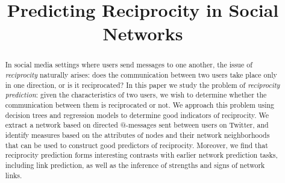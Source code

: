 \documentclass[conference]{IEEEtran}
\begin{document}
\title{Predicting Reciprocity in Social Networks}

\author{
\and
{}
\and
{}
\and
{}
}

\maketitle

\begin{abstract}
In social media settings where users send messages to one another,
the issue of {\em reciprocity} naturally arises: does the communication
between two users take place only in one direction, or is it reciprocated?
In this paper we study the problem of {\em reciprocity prediction}:
given the characteristics of two users, we wish to determine whether
the communication between them is reciprocated or not.
We approach this problem using decision trees and regression models to
determine good indicators of reciprocity.  
We extract a network based
on directed @-messages sent between users on Twitter, and identify
measures based on the attributes of nodes and their
network neighborhoods that can be used to construct good predictors
of reciprocity.
Moreover, we find that reciprocity prediction forms interesting
contrasts with earlier network prediction tasks, including
link prediction, as well as the inference of strengths and signs
of network links.
\end{abstract}

\end{document}
